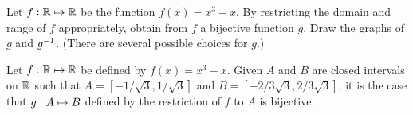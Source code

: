 \documentclass[../main.tex]{subfiles}
\begin{document}
\problem{}\label{s2p6}

Let \({f}: {\mathbb{R}} \mapsto{} {\mathbb{R}}\) be the function \(f(x) = x^3 - x\). By
restricting the domain and range of \(f\) appropriately, obtain from \(f\) a
bijective function \(g\). Draw the graphs of \(g\) and \({g}^{-1}\). (There
are several possible choices for \(g\).)

\begin{thm}
	Let \({f}: {\mathbb{R}} \mapsto{} {\mathbb{R}}\) be defined by \(f(x) = x^3 - x\).
	Given \(A\) and \(B\) are closed intervals on \(\mathbb{R}\) such that
	\(A = [-1/\sqrt{3},1/\sqrt{3}]\) and \(B = [-2/3\sqrt{3},2/3\sqrt{3}]\),
	it is the case that \({g}: {A} \mapsto{} {B}\) defined by the restriction of
	\(f\) to \(A\) is bijective.
\end{thm}
%
\end{document}
